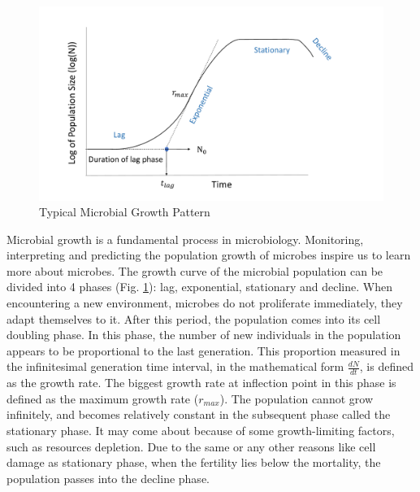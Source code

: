 \documentclass[a4paper]{article}
\begin{document}
\begin{figure}[ht!]
\centering
\includegraphics[width=0.95\linewidth]{Plot/typ_growth_pattern.pdf}
\caption{Typical Microbial Growth Pattern}\label{fig:typ_growth_pattern}
\end{figure}
Microbial growth is a fundamental process in microbiology. Monitoring, interpreting and predicting the population growth of microbes inspire us to learn more about microbes. The growth curve of the microbial population can be divided into 4 phases (Fig. \ref{fig:typ_growth_pattern}): lag, exponential, stationary and decline. When encountering a new environment, microbes do not proliferate immediately, they adapt themselves to it. After this period, the population comes into its cell doubling phase. In this phase, the number of new individuals in the population appears to be proportional to the last generation. This proportion measured in the infinitesimal generation time interval, in the mathematical form $\frac{dN}{dt}$, is defined as the growth rate. The biggest growth rate at inflection point in this phase is defined as the maximum growth rate ($r_{max}$). The population cannot grow infinitely, and becomes relatively constant in the subsequent phase called the stationary phase. It may come about because of some growth-limiting factors, such as resources depletion. Due to the same or any other reasons like cell damage as stationary phase, when the fertility lies below the mortality, the population passes into the decline phase. \\
\end{document}
